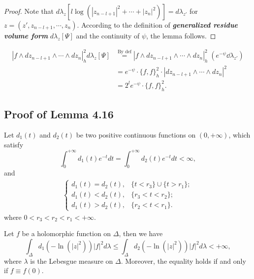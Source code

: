 \documentclass[twoside,openany,12pt]{beautynote}
\newcommand{\itbf}[1]{\textbf{\itshape #1}}\newcommand{\supp}{\operatorname{Supp}}\newcommand{\xu}{\sqrt{-1}}
\begin{document}
  \begin{proof}
  Note that $d\lambda_{z}[l\log(|z_{n-l+1}|^{2}+\cdots+|z_{n}|^{2})] =
  d\lambda_{z'}$ for $z=(z',z_{n-l+1},\cdots,z_{n})$. According to the
  definition of \itbf{\color{purple3} generalized residue volume form} $d\lambda_{z}[\Psi]$
  and the continuity of $\psi$, the lemma follows.
  \end{proof}

\begin{remark}
\begin{align*}
  |f\wedge dz_{n-l+1}\wedge\cdots\wedge dz_{n}|^{2}_{h}d\lambda_{z}[\Psi] &\stackrel{\text{By def}}{=}  |f\wedge dz_{n-l+1}\wedge\cdots\wedge dz_{n}|^{2}_{h}\; (e^{-\psi} \dd \lambda_{z'})\\ 
  &= e^{-\psi}  \cdot \{f,f\}^2_h \cdot |dz_{n-l+1}\wedge\cdots\wedge dz_{n}|^{2}\\ 
  &= 2^l e^{-\psi}  \cdot \{f,f\}^2_h.
\end{align*}
\end{remark}

\subsection{Proof of Lemma 4.16}

\begin{lemma}
  \label{l:extension.equ}
  Let $d_{1}(t)$ and $d_{2}(t)$ be two
  positive continuous functions on $(0,+\infty)$, which satisfy
    $$\int_{0}^{+\infty}d_{1}(t)e^{-t}dt=\int_{0}^{+\infty}d_{2}(t)e^{-t}dt<\infty,$$
    and 
\begin{align*}
  \begin{cases}
    d_1(t)=d_2(t), & \{t<r_{3}\}\cup\{t>r_{1}\};\\
    d_1(t)<d_2(t), & \{r_{3}<t<r_{2}\};\\
    d_1(t)>d_2(t), & \{r_{2}<t<r_{1}\}.
  \end{cases}
\end{align*}
  where $0<r_{3}<r_{2}<r_{1}<+\infty$.

  Let $f$ be a holomorphic function on $\Delta$, then we have
  $$\int_{\Delta}d_{1}(-\ln(|z|^{2}))|f|^{2}d\lambda\leq\int_{\Delta}d_{2}(-\ln(|z|^{2}))|f|^{2}d\lambda<+\infty,$$
  where $\lambda$ is the Lebesgue measure on $\Delta$. Moreover, the
  equality holds if and only if $f\equiv f(0)$.
  \end{lemma}
\end{document}
